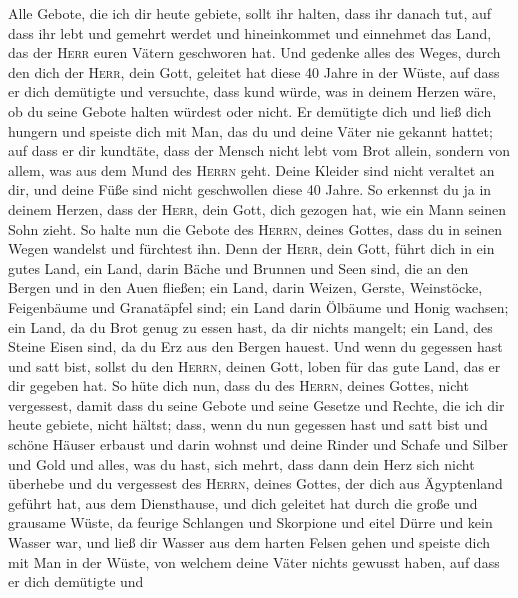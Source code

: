  Alle Gebote, die ich dir heute gebiete, sollt ihr halten,
dass ihr danach tut, auf dass ihr lebt und gemehrt werdet und
hineinkommet und einnehmet das Land, das der \textsc{Herr} euren Vätern
geschworen hat.  Und gedenke alles des Weges, durch den
dich der \textsc{Herr}, dein Gott, geleitet hat diese 40 Jahre in der
Wüste, auf dass er dich demütigte und versuchte, dass kund würde, was in
deinem Herzen wäre, ob du seine Gebote halten würdest oder nicht.
 Er demütigte dich und ließ dich hungern und speiste dich
mit Man, das du und deine Väter nie gekannt hattet; auf dass er dir
kundtäte, dass der Mensch nicht lebt vom Brot allein, sondern von allem,
was aus dem Mund des \textsc{Herrn} geht.  Deine Kleider
sind nicht veraltet an dir, und deine Füße sind nicht geschwollen diese
40 Jahre.  So erkennst du ja in deinem Herzen, dass der
\textsc{Herr}, dein Gott, dich gezogen hat, wie ein Mann seinen Sohn
zieht.  So halte nun die Gebote des \textsc{Herrn}, deines
Gottes, dass du in seinen Wegen wandelst und fürchtest ihn.
 Denn der \textsc{Herr}, dein Gott, führt dich in ein
gutes Land, ein Land, darin Bäche und Brunnen und Seen sind, die an den
Bergen und in den Auen fließen;  ein Land, darin Weizen,
Gerste, Weinstöcke, Feigenbäume und Granatäpfel sind; ein Land darin
Ölbäume und Honig wachsen;  ein Land, da du Brot genug zu
essen hast, da dir nichts mangelt; ein Land, des Steine Eisen sind, da
du Erz aus den Bergen hauest.  Und wenn du gegessen hast
und satt bist, sollst du den \textsc{Herrn}, deinen Gott, loben für das
gute Land, das er dir gegeben hat.  So hüte dich nun,
dass du des \textsc{Herrn}, deines Gottes, nicht vergessest, damit dass
du seine Gebote und seine Gesetze und Rechte, die ich dir heute gebiete,
nicht hältst;  dass, wenn du nun gegessen hast und satt
bist und schöne Häuser erbaust und darin wohnst  und
deine Rinder und Schafe und Silber und Gold und alles, was du hast, sich
mehrt,  dass dann dein Herz sich nicht überhebe und du
vergessest des \textsc{Herrn}, deines Gottes, der dich aus Ägyptenland
geführt hat, aus dem Diensthause,  und dich geleitet hat
durch die große und grausame Wüste, da feurige Schlangen und Skorpione
und eitel Dürre und kein Wasser war, und ließ dir Wasser aus dem harten
Felsen gehen  und speiste dich mit Man in der Wüste, von
welchem deine Väter nichts gewusst haben, auf dass er dich demütigte und

